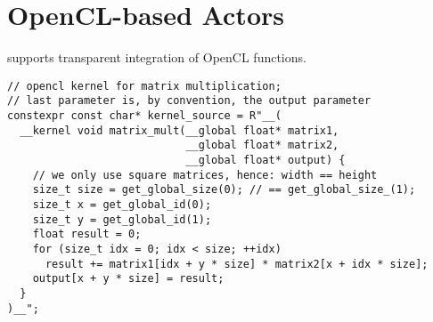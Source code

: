 \section{OpenCL-based Actors}

\libcppa supports transparent integration of OpenCL functions.


\begin{lstlisting}
// opencl kernel for matrix multiplication;
// last parameter is, by convention, the output parameter
constexpr const char* kernel_source = R"__(
  __kernel void matrix_mult(__global float* matrix1,
                            __global float* matrix2,
                            __global float* output) {
    // we only use square matrices, hence: width == height
    size_t size = get_global_size(0); // == get_global_size_(1);
    size_t x = get_global_id(0);
    size_t y = get_global_id(1);
    float result = 0;
    for (size_t idx = 0; idx < size; ++idx)
      result += matrix1[idx + y * size] * matrix2[x + idx * size];
    output[x + y * size] = result;
  }
)__";
\end{lstlisting}


